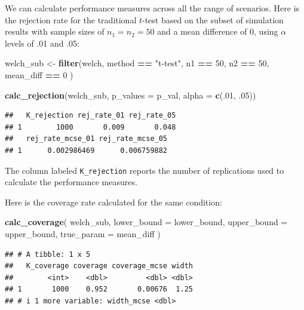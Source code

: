 \documentclass[
]{book}
\newenvironment{Shaded}{\begin{snugshade}}{\end{snugshade}}
\newcommand{\AttributeTok}[1]{\textcolor[rgb]{0.13,0.29,0.53}{#1}}
\newcommand{\DecValTok}[1]{\textcolor[rgb]{0.00,0.00,0.81}{#1}}
\newcommand{\FunctionTok}[1]{\textcolor[rgb]{0.13,0.29,0.53}{\textbf{#1}}}
\newcommand{\NormalTok}[1]{#1}
\newcommand{\OtherTok}[1]{\textcolor[rgb]{0.56,0.35,0.01}{#1}}
\newcommand{\SpecialCharTok}[1]{\textcolor[rgb]{0.81,0.36,0.00}{\textbf{#1}}}
\newcommand{\StringTok}[1]{\textcolor[rgb]{0.31,0.60,0.02}{#1}}
\begin{document}
We can calculate performance measures across all the range of scenarios.
Here is the rejection rate for the traditional \(t\)-test based on the subset of simulation results with sample sizes of \(n_1 = n_2 = 50\) and a mean difference of 0, using \(\alpha\) levels of .01 and .05:

\begin{Shaded}
\begin{Highlighting}[]
\NormalTok{welch\_sub }\OtherTok{\textless{}{-}} \FunctionTok{filter}\NormalTok{(welch, method }\SpecialCharTok{==} \StringTok{"t{-}test"}\NormalTok{, n1 }\SpecialCharTok{==} \DecValTok{50}\NormalTok{, n2 }\SpecialCharTok{==} \DecValTok{50}\NormalTok{, mean\_diff }\SpecialCharTok{==} \DecValTok{0}\NormalTok{ )}

\FunctionTok{calc\_rejection}\NormalTok{(welch\_sub, }\AttributeTok{p\_values =}\NormalTok{ p\_val, }\AttributeTok{alpha =} \FunctionTok{c}\NormalTok{(.}\DecValTok{01}\NormalTok{, .}\DecValTok{05}\NormalTok{))}
\end{Highlighting}
\end{Shaded}

\begin{verbatim}
##   K_rejection rej_rate_01 rej_rate_05
## 1        1000       0.009       0.048
##   rej_rate_mcse_01 rej_rate_mcse_05
## 1      0.002986469      0.006759882
\end{verbatim}

The column labeled \texttt{K\_rejection} reports the number of replications used to calculate the performance measures.

Here is the coverage rate calculated for the same condition:

\begin{Shaded}
\begin{Highlighting}[]
\FunctionTok{calc\_coverage}\NormalTok{(}
\NormalTok{  welch\_sub, }
  \AttributeTok{lower\_bound =}\NormalTok{ lower\_bound, }\AttributeTok{upper\_bound =}\NormalTok{ upper\_bound, }
  \AttributeTok{true\_param =}\NormalTok{ mean\_diff}
\NormalTok{)}
\end{Highlighting}
\end{Shaded}

\begin{verbatim}
## # A tibble: 1 x 5
##   K_coverage coverage coverage_mcse width
##        <int>    <dbl>         <dbl> <dbl>
## 1       1000    0.952       0.00676  1.25
## # i 1 more variable: width_mcse <dbl>
\end{verbatim}
\end{document}
